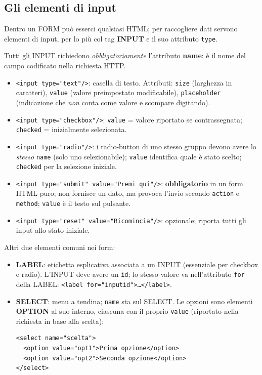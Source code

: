\subsection{Gli elementi di input}
Dentro un FORM pu\`o esserci qualsiasi HTML; per raccogliere dati servono elementi di input,
per lo pi\`u col tag \textbf{INPUT} e il suo attributo \texttt{type}.
\begin{attenzione}
Tutti gli INPUT richiedono \emph{obbligatoriamente} l'attributo \textbf{name}: \`e il nome
del campo codificato nella richiesta HTTP.
\end{attenzione}
\begin{itemize}
  \item \texttt{<input type="text"/>}: casella di testo. Attributi: \texttt{size}
        (larghezza in caratteri), \texttt{value} (valore preimpostato modificabile),
        \texttt{placeholder} (indicazione che \emph{non} conta come valore e scompare
        digitando).
  \item \texttt{<input type="checkbox"/>}: \texttt{value} = valore riportato se
        contrassegnata; \texttt{checked} = inizialmente selezionata.
  \item \texttt{<input type="radio"/>}: i radio-button di uno stesso gruppo devono avere lo
        \emph{stesso} \texttt{name} (solo uno selezionabile); \texttt{value} identifica quale
        \`e stato scelto; \texttt{checked} per la selezione iniziale.
  \item \texttt{<input type="submit" value="Premi qui"/>}: \textbf{obbligatorio} in un form
        HTML puro; non fornisce un dato, ma provoca l'invio secondo \texttt{action} e
        \texttt{method}; \texttt{value} \`e il testo sul pulsante.
  \item \texttt{<input type="reset" value="Ricomincia"/>}: opzionale; riporta tutti gli input
        allo stato iniziale.
\end{itemize}
Altri due elementi comuni nei form:
\begin{itemize}
  \item \textbf{LABEL}: etichetta esplicativa associata a un INPUT (essenziale per checkbox e
        radio). L'INPUT deve avere un \texttt{id}; lo stesso valore va nell'attributo
        \texttt{for} della LABEL: \texttt{<label for="inputid">\dots</label>}.
  \item \textbf{SELECT}: menu a tendina; \texttt{name} sta sul SELECT. Le opzioni sono
        elementi \textbf{OPTION} al suo interno, ciascuna con il proprio \texttt{value}
        (riportato nella richiesta in base alla scelta):
\begin{lstlisting}[language=HTMLCSS]
<select name="scelta">
  <option value="opt1">Prima opzione</option>
  <option value="opt2">Seconda opzione</option>
</select>
\end{lstlisting}
\end{itemize}
